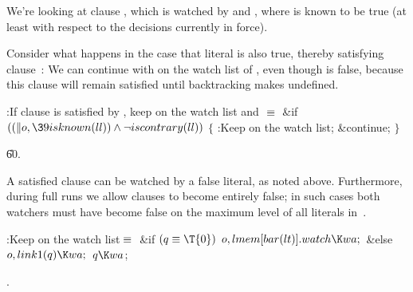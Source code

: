 We're looking at clause , which is watched by  and ,
where  is known to be true (at least with respect to the
decisions currently in force).

Consider what happens in the case that literal  is also true,
thereby satisfying clause~: We can continue with  on the
watch list of , even though  is false,
because this
clause will remain satisfied until backtracking makes  undefined.

\Y\B\4:If clause  is satisfied by , keep 
on the watch list and \X${}\equiv{}$\6
\&{if} ${}((\|o,\39\\{isknown}(\\{ll}))\W\R\\{iscontrary}(\\{ll})){}$\5
${}\{{}$\1\6
:Keep  on the watch list\X;\6
\&{continue};\6
\4${}\}{}$\2\par
\U60.\fi

A satisfied clause  can be watched by a false literal, as
noted above.
Furthermore, during full runs we allow clauses to become entirely false;
in such cases both watchers must have become false
on the maximum level of all literals in~.

\Y\B\4:Keep  on the watch list\X${}\equiv{}$\6
\&{if} ${}(\|q\E\T{0}){}$\1\5
${}\|o,\39\\{lmem}[\\{bar}(\\{lt})].\\{watch}\K\\{wa};{}$\2\6
\&{else}\1\5
${}\|o,\39\\{link1}(\|q)\K\\{wa};{}$\2\6
${}\|q\K\\{wa}{}$;\par
{}.\fi

